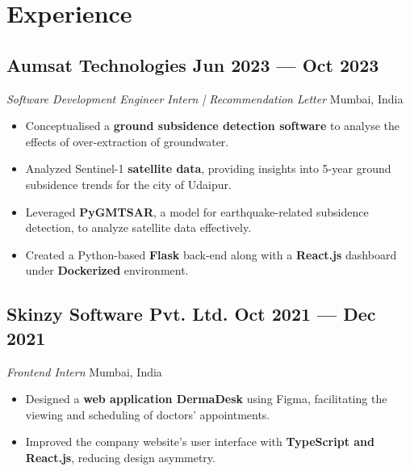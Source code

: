 \documentclass[a4,10pt]{article}
\newenvironment{zitemize}{
\begin{itemize}\itemsep0pt \parskip0pt \parsep1pt}
{\end{itemize}\vspace{-0.5cm}}
\begin{document}
\section{Experience}
\vspace{-0.1cm}
\subsection*{Aumsat Technologies \hfill Jun 2023 --- Oct 2023}{\normalsize\normalfont \emph{Software Development Engineer Intern |  Recommendation Letter}
{\href{https://drive.google.com/file/d/1vJE6YSTlh6K2uZD9EA_xBC5xdifeYI0R/view?usp=sharing}{ \faExternalLink} } 
\hfill Mumbai, India}
\vspace{-0.2cm}
    \begin{zitemize}
        \item Conceptualised a \textbf{ground subsidence detection software} to analyse the effects of over-extraction of groundwater.
        \item Analyzed Sentinel-1 \textbf{satellite data}, providing insights into 5-year ground subsidence trends for the city of Udaipur.
        \item Leveraged \textbf{PyGMTSAR}, a model for earthquake-related subsidence detection, to analyze satellite data effectively.
        \item Created a Python-based \textbf{Flask} back-end along with a \textbf{React.js} dashboard under \textbf{Dockerized} environment.
    \end{zitemize}
    
\subsection*{Skinzy Software Pvt. Ltd. \hfill Oct 2021 --- Dec 2021}{\normalsize\normalfont \emph{Frontend Intern} \hfill Mumbai, India}
\vspace{-0.2cm}
\begin{zitemize}
    \item Designed a \textbf{web application DermaDesk} using Figma, facilitating the viewing and scheduling of doctors' appointments.
    \item Improved the company website's user interface with \textbf{TypeScript and React.js}, reducing design asymmetry.
\end{zitemize}
\vspace{-0.3cm}
    
\end{document}
